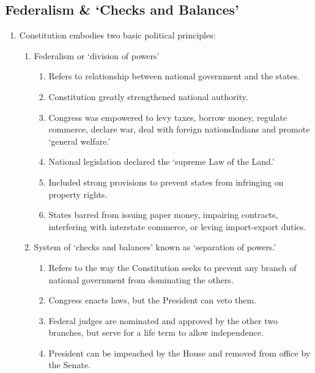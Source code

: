 \documentclass{article}
\begin{document}
    \subsection{Federalism \& `Checks and Balances'}
      \begin{enumerate}
        \item Constitution embodies two basic political principles:
          \begin{enumerate}

            \item Federalism or `division of powers'
              \begin{enumerate}
                \item Refers to relationship between national government and the states.
                \item Constitution greatly strengthened national authority.
                \item Congress was empowered to levy taxes, borrow money, regulate commerce, declare war, deal with foreign nations\/Indians and promote `general welfare.'
                \item National legislation declared the `supreme Law of the Land.'
                \item Included strong provisions to prevent states from infringing on property rights.
                \item States barred from issuing paper money, impairing contracts, interfering with interstate commerce, or leving import-export duties.
              \end{enumerate}

            \item System of `checks and balances' known as `separation of powers.'
              \begin{enumerate}
                \item Refers to the way the Constitution seeks to prevent any branch of national government from dominating the others.
                \item Congress enacts laws, but the President can veto them.
                \item Federal judges are nominated and approved by the other two branches, but serve for a life term to allow independence.
                \item President can be impeached by the House and removed from office by the Senate.
              \end{enumerate}
          \end{enumerate}
      \end{enumerate}
\end{document}
